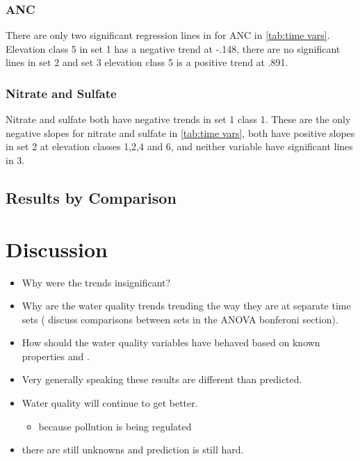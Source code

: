 \subsubsection{ANC}

There are only two significant regression lines in for ANC in \autoref{tab:time vars}.  Elevation class 5 in set 1 has a negative trend at -.148, there are no significant lines in set 2 and set 3 elevation class 5 is a positive trend at .891.  

\subsubsection{Nitrate and Sulfate}

Nitrate and sulfate both have negative trends in set 1 class 1.  These are the only negative slopes for nitrate and sulfate in \autoref{tab:time vars}, both have positive slopes in set 2 at elevation classes 1,2,4 and 6, and neither variable have significant lines in 3.

\subsection{Results by Comparison}

\section{Discussion}

\begin{itemize}
	\item Why were the trends insignificant?
	\item Why are the water quality trends trending the way they are at separate time sets ( discuss comparisons between sets in the ANOVA bonferoni section).
	\item How should the water quality variables have behaved based on known properties and \citep{robinson2008ph}.
	\item Very generally speaking these results are different than \citep{robinson2008ph} predicted.
	\item Water quality will continue to get better.
	\begin{itemize}
		\item because pollution is being regulated
	\end{itemize}
	\item there are still unknowns and prediction is still hard.
\end{itemize}
	
